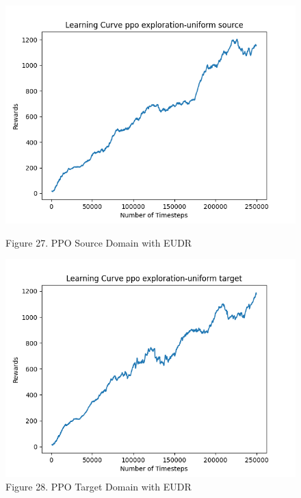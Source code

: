 \documentclass[12pt]{article}
\begin{document}
\begin{figure}[H]
    \vfill
    \begin{minipage}{0.45\textwidth}
        \centering
        \includegraphics[width=\textwidth]{../images/Learning_Curve_PPO_EU_Source.png}
        \caption{Figure 27. PPO Source Domain with EUDR}
        \label{fig:ppo_source_eudr}
    \end{minipage}
    \hfill
    \begin{minipage}{0.45\textwidth}
        \centering
        \includegraphics[width=\textwidth]{../images/Learning_Curve_PPO_EU_Target.png}
        \caption{Figure 28. PPO Target Domain with EUDR}
        \label{fig:ppo_target_eudr}
    \end{minipage}
\end{figure}
\end{document}

